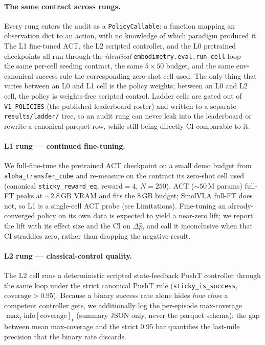 \documentclass[10pt]{article}
\begin{document}
\paragraph{The same contract across rungs.}
\label{sec:ladder-contract}
Every rung enters the audit as a \texttt{PolicyCallable}: a function
mapping an observation dict to an action, with no knowledge of which
paradigm produced it. The L1 fine-tuned ACT, the L2 scripted controller,
and the L0 pretrained checkpoints all run through the \emph{identical}
\texttt{embodimetry.eval.run\_cell} loop --- the same per-cell seeding
contract, the same $5{\times}50$ budget, and the same env-canonical
success rule the corresponding zero-shot cell used. The only thing that
varies between an L0 and L1 cell is the policy weights; between an L0 and
L2 cell, the policy is weights-free scripted control. Ladder cells are
gated out of \texttt{V1\_POLICIES} (the published leaderboard roster) and
written to a separate \texttt{results/ladder/} tree, so an audit rung can
never leak into the leaderboard or rewrite a canonical parquet row, while
still being directly CI-comparable to it.

\paragraph{L1 rung --- continued fine-tuning.}
We full-fine-tune the pretrained ACT checkpoint on a small demo budget
from \texttt{aloha\_transfer\_cube} and re-measure on the contract its
zero-shot cell used (canonical \texttt{sticky\_reward\_eq}, reward${=}4$,
$N{=}250$). ACT (${\sim}50$\,M params) full-FT peaks at ${\sim}2.8$\,GB
VRAM and fits the 8\,GB budget; SmolVLA full-FT does not, so L1 is a
single-cell ACT probe (see Limitations). Fine-tuning an already-converged
policy on its own data is expected to yield a near-zero lift; we report
the lift with its effect size and the CI on $\Delta\hat{p}$, and call it
inconclusive when that CI straddles zero, rather than dropping the
negative result.

\paragraph{L2 rung --- classical-control quality.}
The L2 cell runs a deterministic scripted state-feedback PushT controller
through the same loop under the strict canonical PushT rule
(\texttt{sticky\_is\_success}, $\text{coverage}>0.95$). Because a binary
success rate alone hides \emph{how close} a competent controller gets, we
additionally log the per-episode max-coverage
$\max_t \text{info}[\text{coverage}]_t$ (summary JSON only, never the
parquet schema): the gap between mean max-coverage and the strict $0.95$
bar quantifies the last-mile precision that the binary rate discards.
\end{document}
